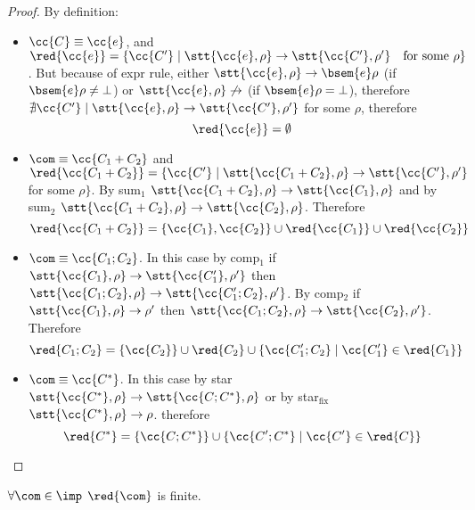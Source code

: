 \begin{proof}
  By definition:
  \begin{itemize}
  \item \(\cc{C}\equiv \cc{e}\), and \(\red{\cc{e}} = \{\cc{C'} \mid
    \stt{\cc{e}, \rho} \to \stt{\cc{C'}, \rho'} \quad \text{for some }
    \rho\}\). But because of expr rule, either \(\stt{\cc{e}, \rho}
    \to \bsem{e}\rho\) (if \(\bsem{e}\rho \neq \bot\)) or
    \(\stt{\cc{e}, \rho} \not\to\) (if \(\bsem{e}\rho = \bot\)),
    therefore \(\nexists \cc{C'} \mid \stt{\cc{e}, \rho} \to
    \stt{\cc{C'}, \rho'}\) for some \(\rho\), therefore \[\red{\cc{e}}
    = \emptyset\]
  \item \(\com \equiv \cc{C_1 + C_2}\) and \(\red{\cc{C_1 + C_2}} =
    \{\cc{C'} \mid \stt{\cc{C_1 + C_2}, \rho} \to \stt{\cc{C'},
      \rho'}\) for some \(\rho\}\). By sum\(_1\) \(\stt{\cc{C_1 +
        C_2}, \rho} \to \stt{\cc{C_1}, \rho}\) and by sum\(_2\)
    \(\stt{\cc{C_1 + C_2}, \rho} \to \stt{\cc{C_2},
      \rho}\). Therefore \[\red{\cc{C_1 + C_2}} = \{\cc{C_1},
    \cc{C_2}\}\cup \red{\cc{C_1}} \cup \red{\cc{C_2}}\]
  \item \(\com \equiv \cc{C_1;C_2}\). In this case by comp\(_1\) if
    \(\stt{\cc{C_1}, \rho}\to \stt{\cc{C_1'}, \rho'}\) then
    \(\stt{\cc{C_1;C_2},\rho} \to \stt{\cc{C_1';C_2}, \rho'}\). By
    comp\(_2\) if \(\stt{\cc{C_1}, \rho}\to \rho'\) then
    \(\stt{\cc{C_1;C_2},\rho} \to \stt{\cc{C_2},
      \rho'}\). Therefore \[\red{C_1;C_2} = \{\cc{C_2}\}\cup
    \red{C_2}\cup\{\cc{C_1';C_2} \mid \cc{C_1'}\in\red{C_1}\}\]
  \item \(\com \equiv \cc{C^*}\). In this case by star
    \(\stt{\cc{C^*}, \rho} \to \stt{\cc{C;C^*}, \rho}\) or by
    star\(_{\text{fix}}\) \(\stt{\cc{C^*}, \rho} \to
    \rho\). therefore \[\red{C^*} = \{\cc{C;C^*}\} \cup
    \{\cc{C';C^*}\mid \cc{C'}\in\red{C}\}\]
  \end{itemize}
\end{proof}

\begin{lemma}\label{le:reductionsfinite}
  \(\forall \com \in \imp\) \(\red{\com}\) is finite.
\end{lemma}

